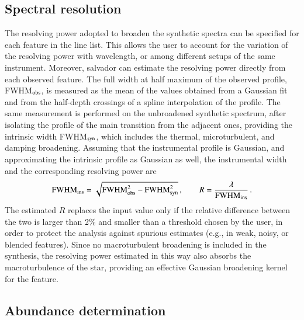\documentclass{aa}
\newcommand{\salvador}{salvador}   %
\begin{document}
\subsection{Spectral resolution}
\label{sec:resolution}

The resolving power adopted to broaden the synthetic spectra can be
specified for each feature in the line list. This allows the user to
account for the variation of the resolving power with wavelength, or
among different setups of the same instrument. Moreover, \salvador{}
can estimate the resolving power directly from each observed feature.
The full width at half maximum of the observed profile,
FWHM$_{\rm obs}$, is measured as the mean of the values obtained from a
Gaussian fit and from the half-depth crossings of a spline
interpolation of the profile. The same measurement is performed on the
unbroadened synthetic spectrum, after isolating the profile of the
main transition from the adjacent ones, providing the intrinsic width
FWHM$_{\rm syn}$, which includes the thermal, microturbulent, and
damping broadening. Assuming that the instrumental profile is Gaussian,
and approximating the intrinsic profile as Gaussian as well, the
instrumental width and the corresponding resolving power are
\begin{equation}
{\rm FWHM}_{\rm ins} = \sqrt{{\rm FWHM}_{\rm obs}^2 -
{\rm FWHM}_{\rm syn}^2}\,, \qquad
R = \frac{\lambda}{{\rm FWHM}_{\rm ins}}\,.
\label{eq:resolution}
\end{equation}
The estimated $R$ replaces the input value only if the relative
difference between the two is larger than 2\% and smaller than a
threshold chosen by the user, in order to protect the analysis
against spurious estimates (e.g., in weak, noisy, or blended
features). Since no macroturbulent broadening is included in the
synthesis, the resolving power estimated in this way also absorbs the
macroturbulence of the star, providing an effective Gaussian
broadening kernel for the feature. 
\subsection{Abundance determination}
\label{sec:abu}
\end{document}
